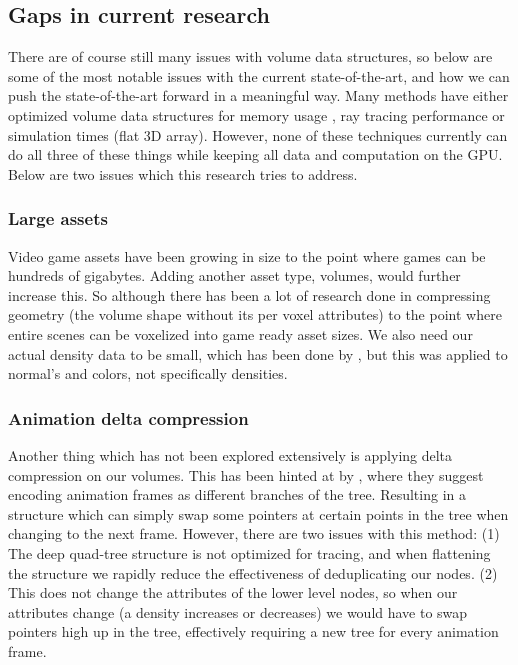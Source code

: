 \subsection{Gaps in current research} \label{related_work:gaps_in_current_research}
There are of course still many issues with volume data structures, so below are some of the most notable issues with the current state-of-the-art, and how we can push the state-of-the-art forward in a meaningful way. Many methods have either optimized volume data structures for memory usage \cite{laine2010efficient}\cite{kampe2013high}, ray tracing performance \cite{van2015real} \cite{soderlund2022ray} \cite{museth2013vdb} or simulation times (flat 3D array). However, none of these techniques currently can do all three of these things while keeping all data and computation on the GPU. Below are two issues which this research tries to address.
\subsubsection{Large assets} \label{related_work:gaps_in_current_research:large_assets}
Video game assets have been growing in size to the point where games can be hundreds of gigabytes. Adding another asset type, volumes, would further increase this. So although there has been a lot of research done in compressing geometry (the volume shape without its per voxel attributes) to the point where entire scenes can be voxelized into game ready asset sizes\cite{van2015real}\cite{museth2013vdb}. We also need our actual density data to be small, which has been done by \cite{dado2016geometry}, but this was applied to normal's and colors, not specifically densities.
\subsubsection{Animation delta compression} \label{related_work:gaps_in_current_research:animation_delta_compression}
Another thing which has not been explored extensively is applying delta compression on our volumes. This has been hinted at by \cite{careil2020interactively}, where they suggest encoding animation frames as different branches of the tree. Resulting in a structure which can simply swap some pointers at certain points in the tree when changing to the next frame. However, there are two issues with this method: (1) The deep quad-tree structure is not optimized for tracing, and when flattening the structure we rapidly reduce the effectiveness of deduplicating our nodes. (2) This does not change the attributes of the lower level nodes, so when our attributes change (a density increases or decreases) we would have to swap pointers high up in the tree, effectively requiring a new tree for every animation frame.